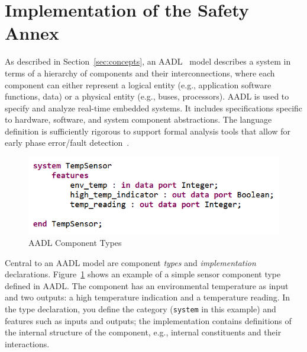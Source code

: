\section{Implementation of the Safety Annex}
\label{sec:impl}

As described in Section~\ref{sec:concepts}, an AADL~\cite{AADL_Standard} model describes a system in terms of a hierarchy of components and their interconnections, where each component can either represent a logical entity (e.g., application software functions, data) or a physical entity (e.g., buses, processors). AADL is used to specify and analyze real-time embedded systems. It includes specifications specific to hardware, software, and system component abstractions. The language definition is sufficiently rigorous to support formal analysis tools that allow for early phase error/fault detection~\cite{FeilerModelBasedEngineering2012}. 

\begin{figure}[h!]
	\begin{center}
	\includegraphics[width=.8\textwidth]{images/aadlComponent.png}
	\caption{AADL Component Types}
	\label{fig:aadlComponent}
	\end{center}
\end{figure}

Central to an AADL model are component \emph{types} and \emph{implementation} declarations. Figure~\ref{fig:aadlComponent} shows an example of a simple sensor component type defined in AADL. The component has an environmental temperature as input and two outputs: a high temperature indication and a temperature reading. In the type declaration, you define the category (\texttt{system} in this example) and features such as inputs and outputs; the implementation contains definitions of the internal structure of the component, e.g., internal constituents and their interactions. 

